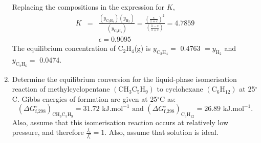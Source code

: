 \documentclass[12pts,a4paper,amsmath,amssymb,floatfix]{article}%
\newcommand{\frc}{\displaystyle\frac}
\newcounter{reaction}
\begin{document}
\begin{enumerate}[1)]
\begin{displaymath}
         \end{displaymath}
       Replacing the compositions in the expression for $K$,
         \begin{eqnarray}
           K  &=& \frc{\left(y_{\text{C}_{2}\text{H}_{4}}\right)\left(y_{\text{H}_{2}}\right)}{\left(y_{\text{C}_{2}\text{H}_{6}}\right)} = \frc{\left(\frc{\epsilon}{1+\epsilon}\right)^{2}}{\left(\frc{1-\epsilon}{1+\epsilon}\right)} =4.7859 \nonumber \\
            &&\epsilon = 0.9095 \nonumber
         \end{eqnarray}
        The equilibrium concentration of C$_{2}$H$_{4}$(g) is $y_{\text{C}_{2}\text{H}_{4}} =$ 0.4763 $=y_{\text{H}_{2}}$ and $y_{\text{C}_{2}\text{H}_{6}}=$ 0.0474.

\clearpage


\item\label{Example:3} Determine the equilibrium conversion for the liquid-phase isomerisation reaction of methylcyclopentane $\left(\text{CH}_{3}\text{C}_{5}\text{H}_{9}\right)$ to cyclohexane $\left(\text{C}_{6}\text{H}_{12}\right)$ at 25$^{\circ}$C. Gibbs energies of formation are given at 25$^{\circ}$C as:
  \begin{displaymath}
     \left(\Delta G^{\circ}_{\text{f,298}}\right)_{\text{CH}_{3}\text{C}_{5}\text{H}_{9}} = 31.72 \text{ kJ.mol}^{-1} \text{ and } \left(\Delta G^{\circ}_{\text{f,298}}\right)_{\text{C}_{6}\text{H}_{12}} = 26.89 \text{ kJ.mol}^{-1}.
  \end{displaymath}
  Also, assume that this isomerisation reaction occurs at relatively low pressure, and therefore $\frc{f_{i}}{f^{\circ}_{i}}=1$. Also, assume that solution is ideal.


\bigskip


\end{enumerate}
\end{document}
